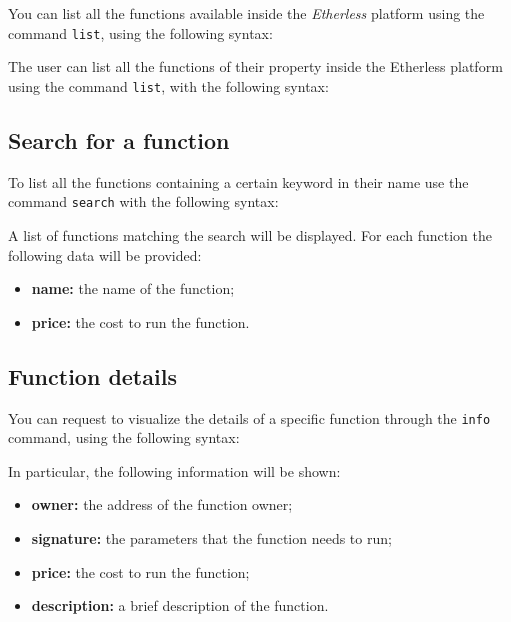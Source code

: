 You can list all the functions available inside the \textit{Etherless} platform using the command \texttt{list}, using the following syntax:
\begin{center}
\end{center}
The user can list all the functions of their property inside the Etherless platform using the command \texttt{list}, with the following syntax:
\begin{center}
\end{center}

\subsection{Search for a function}
To list all the functions containing a certain keyword in their name use the command \texttt{search} with the following syntax:
\begin{center}
\end{center}

A list of functions matching the search will be displayed. For each function the following data will be provided:
\begin{itemize}
	\item \textbf{name: } the name of the function;
	\item \textbf{price: } the cost to run the function.
\end{itemize}

\subsection{Function details}
You can request to visualize the details of a specific function through the \texttt{info} command, using the following syntax: \\
\begin{center}
\end{center}
In particular, the following information will be shown:
\begin{itemize}
	\item \textbf{owner: } the address of the function owner;
	\item \textbf{signature: } the parameters that the function needs to run;
	\item \textbf{price: } the cost to run the function;
	\item \textbf{description: } a brief description of the function.
\end{itemize}

